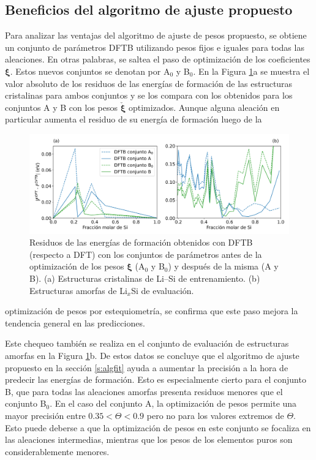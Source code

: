 \subsection{Beneficios del algoritmo de ajuste propuesto}

Para analizar las ventajas del algoritmo de ajuste de pesos propuesto, se
obtiene un conjunto de parámetros DFTB utilizando pesos fijos e iguales para
todas las aleaciones. En otras palabras, se saltea el paso de optimización de los
coeficientes $\boldsymbol{\xi}$. Estos nuevos conjuntos se denotan por A$_0$ y
B$_0$. En la Figura \ref{fig:residuos}a se muestra el valor absoluto de los
residuos de las energías de formación de las estructuras cristalinas para ambos
conjuntos y se los compara con los obtenidos para los conjuntos A y B con
los pesos $\check{\boldsymbol{\xi}}$ optimizados. Aunque alguna aleación en
particular aumenta el residuo de su energía de formación luego de la
\begin{figure}[h!]
	\centering
	\includegraphics[width=\textwidth]{Silicio/modelo/resultados/residuos/residuos.png}
	\caption{Residuos de las energías de formación obtenidos con DFTB (respecto a
	DFT) con los conjuntos de parámetros antes de la optimización de los pesos
    $\boldsymbol{\xi}$ (A$_0$ y B$_0$) y después de la misma (A y B). (a) Estructuras 
    cristalinas de Li--Si de entrenamiento. (b) Estructuras amorfas de Li$_x$Si de
    evaluación.}
	\label{fig:residuos}
\end{figure}
optimización de pesos por estequiometría, se confirma que este paso mejora
la tendencia general en las predicciones.

Este chequeo también se realiza en el conjunto de evaluación de estructuras
amorfas en la Figura \ref{fig:residuos}b. De estos datos se concluye que el
algoritmo de ajuste propuesto en la sección \ref{s:algfit} ayuda a aumentar
la precisión a la hora de predecir las energías de formación. Esto es
especialmente cierto para el conjunto B, que para todas las aleaciones amorfas
presenta residuos menores que el conjunto B$_0$. En el caso del conjunto A, 
la optimización de pesos permite una mayor precisión entre $0.35 < \Theta < 0.9$ 
pero no para los valores extremos de $\Theta$. Esto puede deberse a que la 
optimización de pesos en este conjunto se focaliza en las aleaciones intermedias, 
mientras que los pesos de los elementos puros son considerablemente menores.
